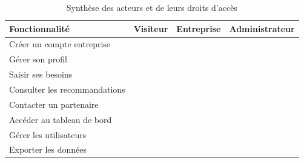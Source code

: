 \documentclass[12pt, a4paper, oneside]{report}
\begin{document}
	\begin{table}[H]
		\centering
		\caption{Synthèse des acteurs et de leurs droits d'accès}
		\label{tab:acteurs}
		\renewcommand{\arraystretch}{1.5}
		\begin{tabularx}{\textwidth}{>{\raggedright\arraybackslash}p{3cm}
				>{\centering\arraybackslash}p{2.2cm}
				>{\centering\arraybackslash}p{2.2cm}
				>{\centering\arraybackslash}X}
			\toprule
			\rowcolor{primary!15}
			\textbf{Fonctionnalité}
			& \textbf{Visiteur}
			& \textbf{Entreprise}
			& \textbf{Administrateur} \\
			\midrule
			
			\rowcolor{lightgray}
			Créer un compte entreprise
			& \textcolor{green!60!black}{\checkmark}
			& \textcolor{green!60!black}{\checkmark}
			& \textcolor{green!60!black}{\checkmark} \\
			
			Gérer son profil
			& \textcolor{accent}{\texttimes}
			& \textcolor{green!60!black}{\checkmark}
			& \textcolor{green!60!black}{\checkmark} \\
			
			\rowcolor{lightgray}
			Saisir ses besoins
			& \textcolor{accent}{\texttimes}
			& \textcolor{green!60!black}{\checkmark}
			& \textcolor{green!60!black}{\checkmark} \\
			
			Consulter les recommandations
			& \textcolor{accent}{\texttimes}
			& \textcolor{green!60!black}{\checkmark}
			& \textcolor{green!60!black}{\checkmark} \\
			
			\rowcolor{lightgray}
			Contacter un partenaire
			& \textcolor{accent}{\texttimes}
			& \textcolor{green!60!black}{\checkmark}
			& \textcolor{green!60!black}{\checkmark} \\
			
			\rowcolor{lightgray}
			Accéder au tableau de bord
			& \textcolor{accent}{\texttimes}
			& \textcolor{accent}{\texttimes}
			& \textcolor{green!60!black}{\checkmark} \\
			
			Gérer les utilisateurs
			& \textcolor{accent}{\texttimes}
			& \textcolor{accent}{\texttimes}
			& \textcolor{green!60!black}{\checkmark} \\
			
			\rowcolor{lightgray}
			Exporter les données
			& \textcolor{accent}{\texttimes}
			& \textcolor{accent}{\texttimes}
			& \textcolor{green!60!black}{\checkmark} \\
			
			\bottomrule
		\end{tabularx}
	\end{table}
	
\end{document}

